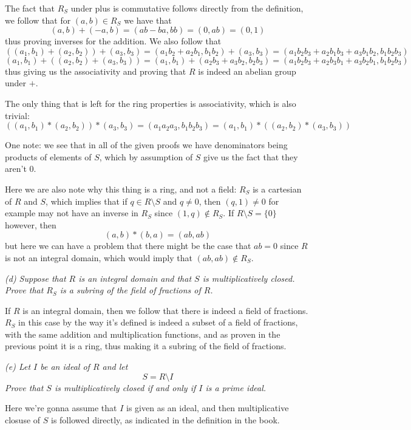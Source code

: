 \documentclass[11pt,oneside,titlepage]{book}
\newcommand{\set}[1]{\{ #1 \}}
\begin{document}
The fact that
$R_S$ under plus is commutative follows directly from the definition,
we follow that for $(a, b) \in R_S $ we have that
$$(a, b) + (-a, b) = (ab - ba, bb) = (0, ab) = (0, 1)$$
thus proving inverses for the addition. We also follow that
$$((a_1, b_1) + (a_2, b_2)) + (a_3, b_3) =
(a_1 b_2 + a_2 b_1, b_1 b_2) + (a_3, b_3) =
(a_1 b_2 b_3 + a_2 b_1 b_3 + a_3 b_1 b_2, b_1 b_2 b_3)$$
$$(a_1, b_1) + ((a_2, b_2) + (a_3, b_3)) =
(a_1, b_1) + (a_2 b_3 + a_3 b_2, b_2 b_3) = 
(a_1 b_2 b_3 + a_2 b_3 b_1 + a_3 b_2 b_1, b_1 b_2 b_3)$$
thus giving us the associativity and proving that $R$ is
indeed an abelian group under $+$.

The only thing that is left for the ring properties is associativity,
which is also trivial:
$$((a_1, b_1) * (a_2, b_2)) * (a_3, b_3) = (a_1 a_2 a_3, b_1 b_2 b_3) =
(a_1, b_1) * ((a_2, b_2) * (a_3, b_3))$$

One note: we see that in all of the given proofs we have
denominators being products of elements of $S$, which by assumption
of $S$ give us the fact that they aren't 0. 

Here we are also note why this thing is a ring, and not a field:
$R_S$ is a cartesian of $R$ and $S$, which implies that if
$q \in R \setminus S$ and $q \neq 0$, then $(q, 1) \neq 0$ for example
may not have an inverse in $R_S$ since $(1, q) \notin R_S$.  If $R
\setminus S = \set{0}$ however, then
$$(a, b) * (b, a) = (ab, ab)$$
but here we can have a problem that there might be the case that $ab =
0$ since $R$ is not an integral domain, which would imply that $(ab,
ab) \notin R_S$.

\textit{(d) Suppose that $R$ is an integral domain and that $S$ is
  multiplicatively closed. Prove that $R_S$ is a subring of the field
  of fractions of $R$.}

If $R$ is an integral domain, then we follow that there is indeed a
field of fractions. $R_S$ in this case by the way it's defined is
indeed a subset of a field of fractions, with the same addition and
multiplication functions, and as proven in the previous point it is a
ring, thus making it a subring of the field of fractions.

\textit{(e) Let $I$ be an ideal of $R$ and let
  $$S = R \setminus I$$
  Prove that $S$ is multiplicatively closed if and only if $I$
  is a prime ideal.}

Here we're gonna assume that $I$ is given as an ideal, and then
multiplicative closuse of $S$ is followed directly, as indicated in the
definition in the book.
\end{document}
